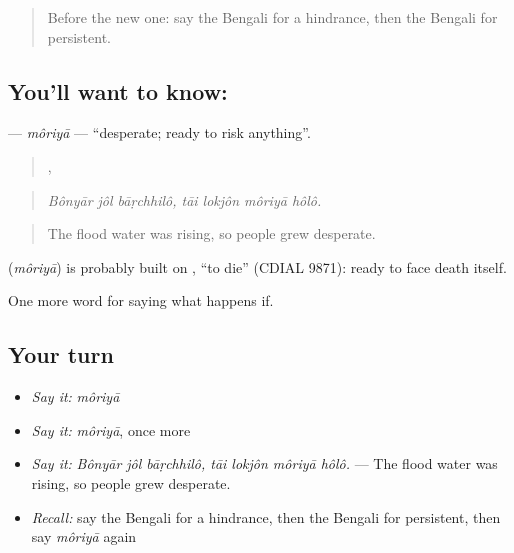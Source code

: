 \label{lesson:BN-C539-moriya}



\begin{quote}
Before the new one: say the Bengali for a hindrance, then the Bengali for persistent.
\end{quote}

\subsection*{You'll want to know: }
\textbf{} — \emph{môriyā} — \textquotedblleft{}desperate; ready to risk anything\textquotedblright{}.

\begin{quote}
  ,    
\end{quote}

\begin{quote}
\emph{Bônyār jôl bāṛchhilô, tāi lokjôn môriyā hôlô.}
\end{quote}

\begin{quote}
The flood water was rising, so people grew desperate.
\end{quote}

\begin{cousinweb}
\textbf{} (\emph{môriyā}) is probably built on , \textquotedblleft{}to die\textquotedblright{} (CDIAL 9871): ready to face death itself.
\end{cousinweb}

\begin{grammarlens}[title={What you've built}]
One more word for saying what happens if.
\end{grammarlens}

\subsection*{Your turn}
\begin{itemize}
\raggedright
  \item \emph{Say it:} \emph{môriyā}
  \item \emph{Say it:} \emph{môriyā}, once more
  \item \emph{Say it:} \emph{Bônyār jôl bāṛchhilô, tāi lokjôn môriyā hôlô.} — The flood water was rising, so people grew desperate.
  \item \emph{Recall:} say the Bengali for a hindrance, then the Bengali for persistent, then say \emph{môriyā} again
\end{itemize}

